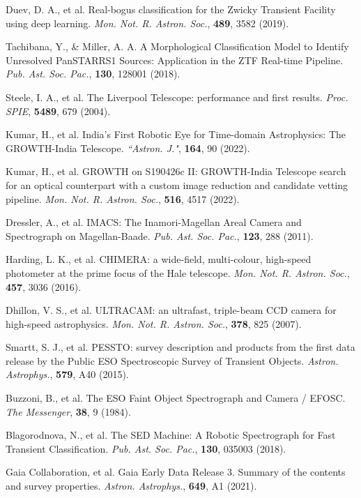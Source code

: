 \documentclass{nature_plusfigure}
\newcommand{\mn}{{Mon. Not. R. Astron. Soc.}}
\newcommand{\mnras}{\mn}
\newcommand{\aj}{{``Astron. J."}}
\newcommand{\aap}{{Astron. Astrophys.}}
\newcommand{\pasp}{{Pub. Ast. Soc. Pac.}}
\newcommand{\procspie}{Proc. SPIE}
\begin{document}
\begin{methods}
\begin{thebibliography}{10}
  Duev, D. A., et al. Real-bogus classification for the Zwicky Transient Facility using deep learning. \emph{\mnras}, \textbf{489}, 3582 (2019). 

 Tachibana, Y., \& Miller, A. A. A Morphological Classification Model to Identify Unresolved PanSTARRS1 Sources: Application in the ZTF Real-time Pipeline. \emph{\pasp}, \textbf{130}, 128001 (2018). 

 Steele, I. A., et al. The Liverpool Telescope: performance and first results. \emph{\procspie}, \textbf{5489}, 679 (2004). 

 Kumar, H., et al. India's First Robotic Eye for Time-domain Astrophysics: The GROWTH-India Telescope. \emph{\aj}, \textbf{164}, 90 (2022). 

 Kumar, H., et al. GROWTH on S190426c II: GROWTH-India Telescope search for an optical counterpart with a custom image reduction and candidate vetting pipeline. \emph{\mnras}, \textbf{516}, 4517 (2022). 

 Dressler, A., et al. IMACS: The Inamori-Magellan Areal Camera and Spectrograph on Magellan-Baade. \emph{\pasp}, \textbf{123}, 288 (2011). 

 Harding, L. K., et al. CHIMERA: a wide-field, multi-colour, high-speed photometer at the prime focus of the Hale telescope. \emph{\mnras}, \textbf{457}, 3036 (2016). 

 Dhillon, V. S., et al. ULTRACAM: an ultrafast, triple-beam CCD camera for high-speed astrophysics. \emph{\mnras}, \textbf{378}, 825 (2007). 

  Smartt, S. J., et al. PESSTO: survey description and products from the first data release by the Public ESO Spectroscopic Survey of Transient Objects. \emph{\aap}, \textbf{579}, A40 (2015). 

 Buzzoni, B., et al. The ESO Faint Object Spectrograph and Camera / EFOSC. \emph{The Messenger}, \textbf{38}, 9 (1984). 

  Blagorodnova, N., et al. The SED Machine: A Robotic Spectrograph for Fast Transient Classification. \emph{\pasp}, \textbf{130}, 035003 (2018). 
 
  Gaia Collaboration, et al. Gaia Early Data Release 3. Summary of the contents and survey properties. \emph{\aap}, \textbf{649}, A1 (2021). 


\end{thebibliography}
\end{methods}
\end{document}
